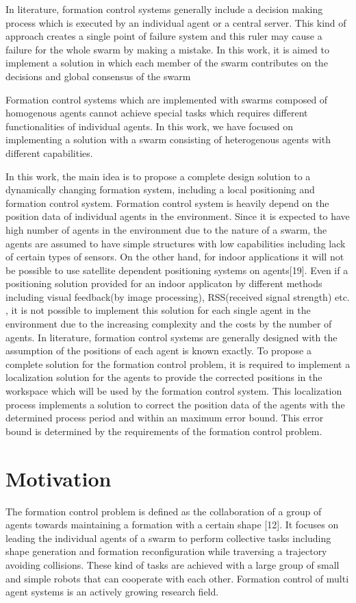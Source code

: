 In literature, formation control systems generally include a decision making process which is executed by an individual agent or a central server. This kind of approach creates a single point of failure system and this ruler may cause a failure for the whole swarm by making a mistake. In this work, it is aimed to implement a solution in which each member of the swarm contributes on the decisions and global consensus of the swarm

Formation control systems which are implemented with swarms composed of homogenous agents cannot achieve special tasks which requires different functionalities of individual agents. In this work, we have focused on implementing a solution with a swarm consisting of heterogenous agents with different capabilities. 

In this work, the main idea is to propose a complete design solution to a dynamically changing formation system, including a local positioning and formation control system. Formation control system is heavily depend on the position data of individual agents in the environment. Since it is expected to have high number of agents in the environment due to the nature of a swarm, the agents are assumed to have simple structures with low capabilities including lack of certain types of sensors. On the other hand, for indoor applications it will not be possible to use satellite dependent positioning systems on agents[19]. Even if a positioning solution provided for an indoor applicaton by different methods including visual feedback(by image processing), RSS(received signal strength) etc. , it is not possible to implement this solution for each single agent in the environment due to the increasing complexity and the costs by the number of agents. In literature, formation control systems are generally designed with the assumption of the positions of each agent is known exactly. To propose a complete solution for the formation control problem, it is required to implement a localization solution for the agents to provide the corrected positions in the workspace which will be used by the formation control system. This localization process implements a solution to correct the position data of the agents with the determined process period and within an maximum error bound. This error bound is determined by the requirements of the formation control problem. 

\section{Motivation}
The formation control problem is defined as the collaboration of a group of agents towards maintaining a formation with a certain shape [12]. It focuses on leading the individual agents of a swarm to perform  collective tasks including shape generation and formation reconfiguration while traversing a trajectory avoiding collisions. These kind of tasks are achieved with a large group of small and simple robots  that can cooperate with each other. Formation control of multi agent systems  is an actively growing research field.

